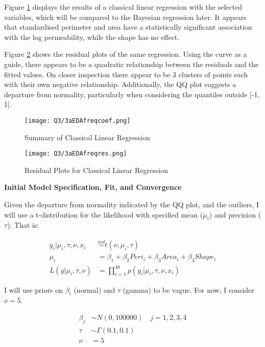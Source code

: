 \documentclass{article}
\begin{document}
Figure \ref{Fig3freqres} displays the results of a classical linear regression with the selected variables, which will be compared to the Bayesian regression later. It appears that standardised perimeter and area have a statistically significant association with the log permeability, while the shape has no effect. 

Figure \ref{Fig3b} shows the residual plots of the same regression. Using the curve as a guide, there appears to be a quadratic relationship between the residuals and the fitted values. On closer inspection there appear to be 3 clusters of points each with their own negative relationship. Additionally, the QQ plot suggests a departure from normality, particularly when considering the quantiles outside [-1, 1].


\begin{figure}[!h]
\centering
\texttt{[image: Q3/3aEDAfreqcoef.png]}
\caption{Summary of Classical Linear Regression} \label{Fig3freqres}
\end{figure}
\begin{figure}[h]
\centering
\texttt{[image: Q3/3aEDAfreqres.png]}
\caption{Residual Plots for Classical Linear Regression} \label{Fig3b}
\end{figure}

\newpage

\textbf{Initial Model Specification, Fit, and Convergence} \label{sec:3b}

Given the departure from normality indicated by the QQ plot, and the outliers, I will use a t-distribution for the likelihood with specified mean ($\mu_i$) and precision ($\tau$). That is:

\begin{align}
y_i | \mu_i, \tau, \nu, x_i  &\stackrel{ind}{\sim}  t(\nu, \mu_i, \tau) \\
\mu_i &= \beta_1 + \beta_2 Peri_i +  \beta_3 Area_i + \beta_4 Shape_i \\
L(y | \mu_i, \tau, \nu) &= \prod_{i=1}^{48} p(y_i | \mu_i, \tau, \nu, x_i)
\end{align}

I will use priors on $\beta_i$ (normal) and $\tau$ (gamma) to be vague. For now, I consider $\nu = 5$. 

\begin{align}
\beta_j &\sim N(0, 100000) \quad j = 1, 2, 3, 4 \\
\tau &\sim \Gamma(0.1, 0.1) \\
\nu &= 5
\end{align}
\end{document}
